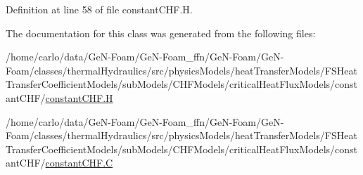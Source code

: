 Definition at line 58 of file constant\+C\+H\+F.\+H.



The documentation for this class was generated from the following files\+:\begin{DoxyCompactItemize}
\item 
/home/carlo/data/\+Ge\+N-\/\+Foam/\+Ge\+N-\/\+Foam\+\_\+ffn/\+Ge\+N-\/\+Foam/\+Ge\+N-\/\+Foam/classes/thermal\+Hydraulics/src/physics\+Models/heat\+Transfer\+Models/\+F\+S\+Heat\+Transfer\+Coefficient\+Models/sub\+Models/\+C\+H\+F\+Models/critical\+Heat\+Flux\+Models/constant\+C\+H\+F/\hyperlink{constantCHF_8H}{constant\+C\+H\+F.\+H}\item 
/home/carlo/data/\+Ge\+N-\/\+Foam/\+Ge\+N-\/\+Foam\+\_\+ffn/\+Ge\+N-\/\+Foam/\+Ge\+N-\/\+Foam/classes/thermal\+Hydraulics/src/physics\+Models/heat\+Transfer\+Models/\+F\+S\+Heat\+Transfer\+Coefficient\+Models/sub\+Models/\+C\+H\+F\+Models/critical\+Heat\+Flux\+Models/constant\+C\+H\+F/\hyperlink{constantCHF_8C}{constant\+C\+H\+F.\+C}\end{DoxyCompactItemize}
